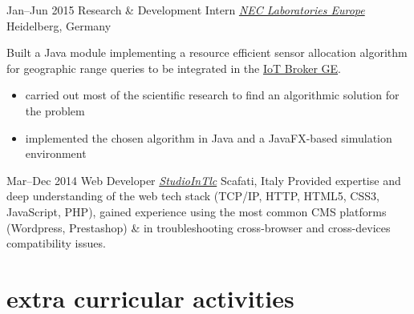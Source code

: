 \begin{entrylist}
\entry
{Jan--Jun 2015}
{Research \& Development Intern {\normalfont \emph{\href{https://uk.nec.com/}{NEC Laboratories Europe}}}}
{Heidelberg, Germany}
{Built a Java module implementing a resource efficient sensor allocation algorithm for geographic range queries to be integrated in the \href{https://github.com/Aeronbroker/Aeron}{IoT Broker GE}.
\vspace{-.2cm}
\begin{itemize}[leftmargin=.6cm]
	\item carried out most of the scientific research to find an algorithmic solution for the problem
	\item implemented the chosen algorithm in Java and a JavaFX-based simulation environment
\end{itemize}
}

\entry
{Mar--Dec 2014}
{Web Developer {\normalfont \emph{\href{http://www.studiointlc.com/}{StudioInTlc}}}}
{Scafati, Italy}
{Provided expertise and deep understanding of the web tech stack (TCP/IP, HTTP, HTML5, CSS3, JavaScript, PHP), gained  experience using the most common CMS platforms (Wordpress, Prestashop) \& in troubleshooting cross-browser and cross-devices compatibility issues.
}

\end{entrylist}

\section{\normalfont extra curricular activities}

